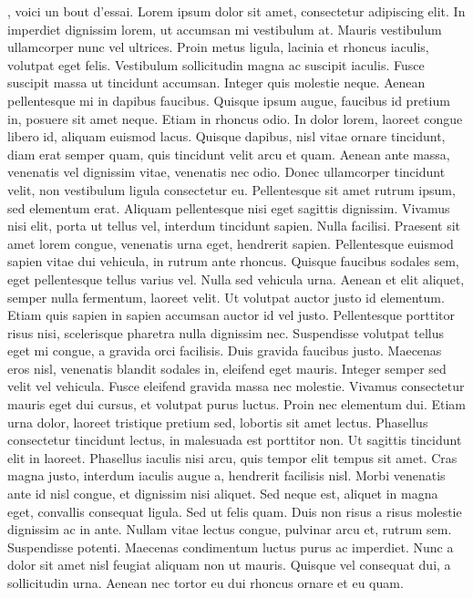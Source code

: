\documentclass{article}
\begin{document}
\beginnumbering
\pstart
{}, voici un bout d'essai.
Lorem ipsum dolor sit amet, consectetur adipiscing elit. In imperdiet dignissim lorem, ut accumsan mi vestibulum at. Mauris vestibulum ullamcorper nunc vel ultrices. Proin metus ligula, lacinia et rhoncus iaculis, volutpat eget felis. Vestibulum sollicitudin magna ac suscipit iaculis. Fusce suscipit massa ut tincidunt accumsan. Integer quis molestie neque. Aenean pellentesque mi in dapibus faucibus.
Quisque ipsum augue, faucibus id pretium in, posuere sit amet neque. Etiam in rhoncus odio. In dolor lorem, laoreet congue libero id, aliquam euismod lacus. Quisque dapibus, nisl vitae ornare tincidunt, diam erat semper quam, quis tincidunt velit arcu et quam. Aenean ante massa, venenatis vel dignissim vitae, venenatis nec odio. Donec ullamcorper tincidunt velit, non vestibulum ligula consectetur eu. Pellentesque sit amet rutrum ipsum, sed elementum erat. Aliquam pellentesque nisi eget sagittis dignissim. Vivamus nisi elit, porta ut tellus vel, interdum tincidunt sapien. Nulla facilisi. Praesent sit amet lorem congue, venenatis urna eget, hendrerit sapien. Pellentesque euismod sapien vitae dui vehicula, in rutrum ante rhoncus. Quisque faucibus sodales sem, eget pellentesque tellus varius vel. Nulla sed vehicula urna. Aenean et elit aliquet, semper nulla fermentum, laoreet velit.
Ut volutpat auctor justo id elementum. Etiam quis sapien in sapien accumsan auctor id vel justo. Pellentesque porttitor risus nisi, scelerisque pharetra nulla dignissim nec. Suspendisse volutpat tellus eget mi congue, a gravida orci facilisis. Duis gravida faucibus justo. Maecenas eros nisl, venenatis blandit sodales in, eleifend eget mauris. Integer semper sed velit vel vehicula. Fusce eleifend gravida massa nec molestie. Vivamus consectetur mauris eget dui cursus, et volutpat purus luctus. Proin nec elementum dui. Etiam urna dolor, laoreet tristique pretium sed, lobortis sit amet lectus. Phasellus consectetur tincidunt lectus, in malesuada est porttitor non. Ut sagittis tincidunt elit in laoreet. Phasellus iaculis nisi arcu, quis tempor elit tempus sit amet. Cras magna justo, interdum iaculis augue a, hendrerit facilisis nisl.
Morbi venenatis ante id nisl congue, et dignissim nisi aliquet. Sed neque est, aliquet in magna eget, convallis consequat ligula. Sed ut felis quam. Duis non risus a risus molestie dignissim ac in ante. Nullam vitae lectus congue, pulvinar arcu et, rutrum sem. Suspendisse potenti. Maecenas condimentum luctus purus ac imperdiet. Nunc a dolor sit amet nisl feugiat aliquam non ut mauris. Quisque vel consequat dui, a sollicitudin urna. Aenean nec tortor eu dui rhoncus ornare et eu quam.
\end{document}
